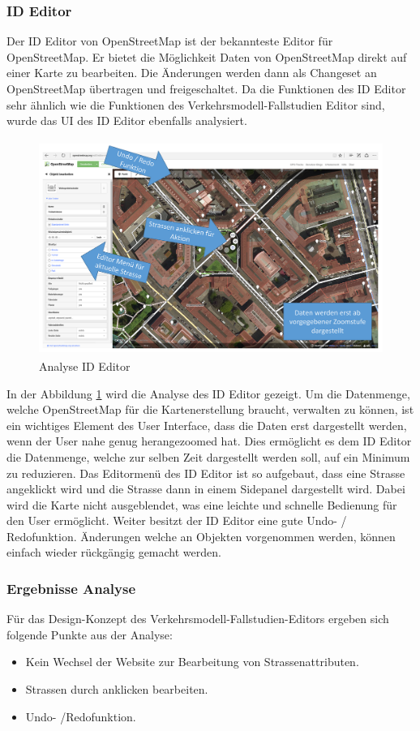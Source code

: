 \subsubsection{ID Editor}
Der ID Editor von OpenStreetMap ist der bekannteste Editor für OpenStreetMap. Er bietet die Möglichkeit Daten von OpenStreetMap direkt auf einer Karte zu bearbeiten. Die Änderungen werden dann als Changeset an OpenStreetMap übertragen und freigeschaltet. Da die Funktionen des ID Editor sehr ähnlich wie die Funktionen des Verkehrsmodell-Fallstudien Editor sind, wurde das UI des ID Editor ebenfalls analysiert.
\begin{figure}[H]
\centering
\includegraphics[height=7cm]{images/AnalyseIDEditor.png}
\caption{Analyse ID Editor}
\label{fig:ideditor}
\end{figure}
\noindent
In der Abbildung \ref{fig:ideditor}  wird die Analyse des ID Editor gezeigt. Um die Datenmenge, welche OpenStreetMap für die Kartenerstellung braucht, verwalten zu können, ist ein wichtiges Element des User Interface, dass die Daten erst dargestellt werden, wenn der User nahe genug herangezoomed hat. Dies ermöglicht es dem ID Editor die Datenmenge, welche zur selben Zeit dargestellt werden soll, auf ein Minimum zu reduzieren. Das Editormenü des ID Editor ist so aufgebaut, dass eine Strasse angeklickt wird und die Strasse dann in einem Sidepanel dargestellt wird. Dabei wird die Karte nicht ausgeblendet, was eine leichte und schnelle Bedienung für den User ermöglicht. Weiter besitzt der ID Editor eine gute Undo- / Redofunktion. Änderungen welche an Objekten vorgenommen werden, können einfach wieder rückgängig gemacht werden.
\subsubsection*{Ergebnisse Analyse}
Für das Design-Konzept des Verkehrsmodell-Fallstudien-Editors ergeben sich folgende Punkte aus der Analyse:
\begin{itemize}
\item Kein Wechsel der Website zur Bearbeitung von Strassenattributen.
\item Strassen durch anklicken bearbeiten.
\item Undo- /Redofunktion.
\end{itemize}
\newpage
